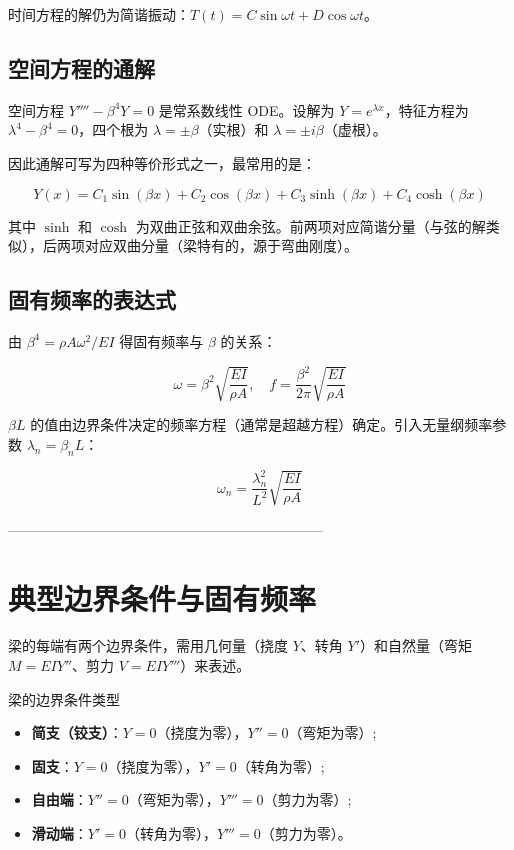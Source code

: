 时间方程的解仍为简谐振动：$T(t) = C\sin\omega t + D\cos\omega t$。

\subsection{空间方程的通解}

空间方程 $Y'''' - \beta^4 Y = 0$ 是常系数线性 ODE。设解为 $Y = e^{\lambda x}$，特征方程为 $\lambda^4 - \beta^4 = 0$，四个根为 $\lambda = \pm\beta$（实根）和 $\lambda = \pm i\beta$（虚根）。

因此通解可写为四种等价形式之一，最常用的是：

\begin{myformula}
\[
Y(x) = C_1\sin(\beta x) + C_2\cos(\beta x) + C_3\sinh(\beta x) + C_4\cosh(\beta x)
\]
\end{myformula}

其中 $\sinh$ 和 $\cosh$ 为双曲正弦和双曲余弦。前两项对应简谐分量（与弦的解类似），后两项对应双曲分量（梁特有的，源于弯曲刚度）。

\subsection{固有频率的表达式}

由 $\beta^4 = \rho A\omega^2/EI$ 得固有频率与 $\beta$ 的关系：

\begin{myformula}
\[
\omega = \beta^2\sqrt{\frac{EI}{\rho A}}, \quad f = \frac{\beta^2}{2\pi}\sqrt{\frac{EI}{\rho A}}
\]
\end{myformula}

$\beta L$ 的值由边界条件决定的频率方程（通常是超越方程）确定。引入无量纲频率参数 $\lambda_n = \beta_n L$：

\[
\omega_n = \frac{\lambda_n^2}{L^2}\sqrt{\frac{EI}{\rho A}}
\]

--------------------------------------------------------------------
\section{典型边界条件与固有频率}

梁的每端有两个边界条件，需用几何量（挠度 $Y$、转角 $Y'$）和自然量（弯矩 $M = EI Y''$、剪力 $V = EI Y'''$）来表述。

\begin{mydefinition}{梁的边界条件类型}
\begin{itemize}
    \item \textbf{简支（铰支）}：$Y = 0$（挠度为零），$Y'' = 0$（弯矩为零）;
    \item \textbf{固支}：$Y = 0$（挠度为零），$Y' = 0$（转角为零）;
    \item \textbf{自由端}：$Y'' = 0$（弯矩为零），$Y''' = 0$（剪力为零）;
    \item \textbf{滑动端}：$Y' = 0$（转角为零），$Y''' = 0$（剪力为零）。
\end{itemize}
\end{mydefinition}

